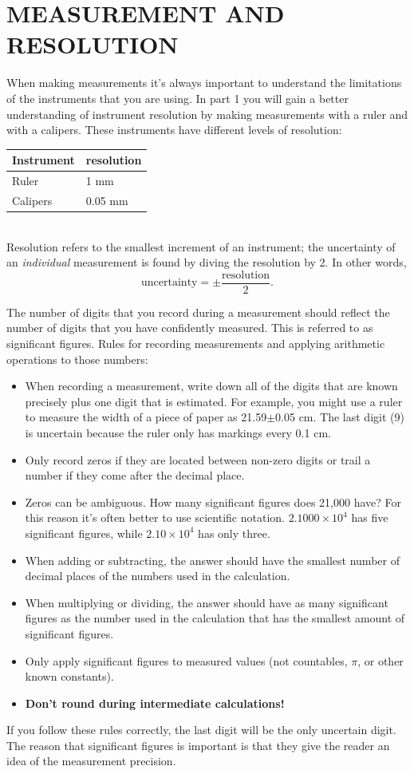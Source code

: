 \documentclass[11pt,letterpaper]{article}
\begin{document}
\section{MEASUREMENT AND RESOLUTION}
When making measurements it's always important to understand the limitations of the instruments that you are using. In part 1 you will gain a better understanding of instrument resolution by making measurements with a ruler and with a calipers. These instruments have different levels of resolution:
\begin{table}[h]
\begin{tabular}{ll}
Instrument \hspace*{5mm} & resolution\\
\hline
Ruler & 1 mm\\
Calipers & 0.05 mm\\
\hline
\end{tabular}
\end{table}\\
Resolution refers to the smallest increment of an instrument; the uncertainty of an \textit{individual} measurement is found by diving the resolution by 2. In other words,
$$\mbox{uncertainty}=\pm\frac{\mbox{resolution}}{2}.$$

The number of digits that you record during a measurement should reflect the number of digits that you have confidently measured. This is referred to as significant figures. Rules for recording measurements and applying arithmetic operations to those numbers:
\begin{itemize}
\item When recording a measurement, write down all of the digits that are known precisely plus one digit that is estimated. For example, you might use a ruler to measure the width of a piece of paper as 21.59$\pm$0.05 cm. The last digit (9) is uncertain because the ruler only has markings every 0.1 cm.
\item Only record zeros if they are located between non-zero digits or trail a number if they come after the decimal place.
\item Zeros can be ambiguous. How many significant figures does 21,000 have? For this reason it's often better to use scientific notation. $2.1000\times{10^4}$ has five significant figures, while $2.10\times{10^4}$ has only three.
\item When adding or subtracting, the answer should have the smallest number of decimal places of the numbers used in the calculation.
\item When multiplying or dividing, the answer should have as many significant figures as the number used in the calculation that has the smallest amount of significant figures.
\item Only apply significant figures to measured values (not countables, $\pi$, or other known constants). 
\item \textbf{Don't round during intermediate calculations!}
\end{itemize}
If you follow these rules correctly, the last digit will be the only uncertain digit. The reason that significant figures is important is that they give the reader an idea of the measurement precision.
\end{document}
